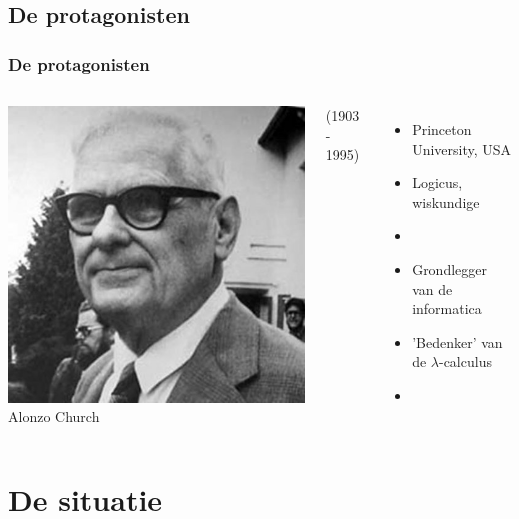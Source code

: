 \documentclass{beamer}
\begin{document}
\subsection{De protagonisten}
\begin{frame}
    \frametitle{De protagonisten}
    \begin{columns}
        \includegraphics[width=\textwidth]{Church.jpeg}
        {\Large Alonzo Church}

        (1903 - 1995)

        \begin{itemize}
            \item Princeton University, USA
            \item Logicus, wiskundige
            \item 
            \item Grondlegger van de informatica
            \item 'Bedenker' van de $\lambda$-calculus
            \item 
        \end{itemize}    
    \end{columns}
\end{frame}


\section{De situatie}
\end{document}
